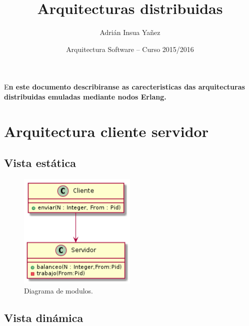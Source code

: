 \documentclass[DIV=calc,paper=a4,fontsize=11pt,onecolumn]{scrartcl}	 %
\title{Arquitecturas distribuidas} %
\author{Adrián Insua Yañez} %
\date{Arquitectura Software -- Curso 2015/2016} %
\newcommand{\initial}[1]{ %
\lettrine[lines=3,lhang=0.3,nindent=0em]{
\color{UDC}
{\textsf{#1}}}{}}
\begin{document}
\maketitle %

\thispagestyle{fancy} %


\initial{E}\textbf{n este documento describiranse as carecteristicas das arquitecturas distribuidas emuladas mediante nodos Erlang.}

\vspace*{1cm}

\tableofcontents

\clearpage


\section{Arquitectura cliente servidor}

\subsection{Vista estática}
\begin{figure}[h]
\centering
\includegraphics[width = 0.5\textwidth]{./figuras/estaticoCS.png}
\caption{Diagrama de modulos.}
\label{fig:estCS}
\end{figure}
\newpage
\subsection{Vista dinámica}
\end{document}
